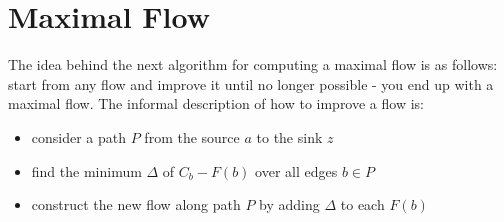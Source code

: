 \section{Maximal Flow}

The idea behind the next algorithm for computing a maximal flow is as
follows: start from any flow and improve it until no longer possible -
you end up with a maximal flow. The informal description of how to
improve a flow is:
\begin{itemize}
\item
consider a path $P$ from the source $a$ to the sink $z$
\item
find the minimum $\Delta$ of $C_{b} - F(b)$ over all edges $b \in P$
\item
construct the new flow along path $P$ by adding $\Delta$ to each $F(b)$
\end{itemize}

